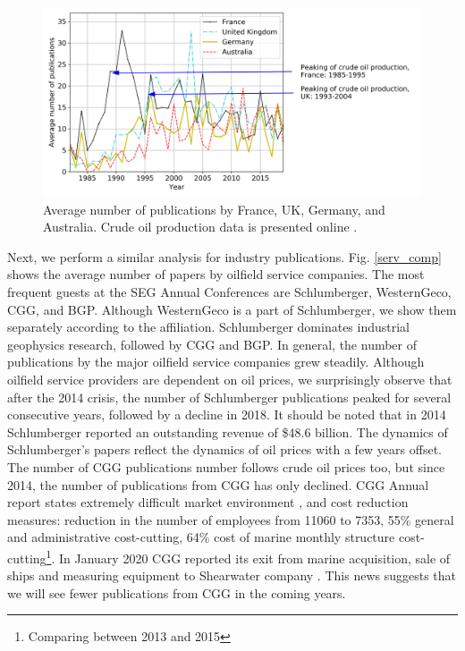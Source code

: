 \documentclass[geosciences,article,submit,moreauthors,pdftex]{Definitions/mdpi}
\begin{document}
\begin{figure}[ht!]
\includegraphics[width=\textwidth]{4_second_countries.png}
\caption{Average number of publications by France, UK, Germany, and Australia. Crude oil production data is presented online \citep{CEIC2020}.}
\label{acad_countries8}
\end{figure}


Next, we perform a similar analysis for industry publications. Fig. \ref{serv_comp} shows the average number of papers by oilfield service companies. The most frequent guests at the SEG Annual Conferences are Schlumberger, WesternGeco, CGG, and BGP. Although WesternGeco is a part of Schlumberger, we show them separately according to the affiliation. Schlumberger dominates industrial geophysics research, followed by CGG and BGP. In general, the number of publications by the major oilfield service companies grew steadily. Although oilfield service providers are dependent on oil prices, we surprisingly observe that after the 2014 crisis, the number of Schlumberger publications peaked for several consecutive years, followed by a decline in 2018. It should be noted that in 2014 Schlumberger reported an outstanding revenue of \$48.6 billion. The dynamics of Schlumberger's papers reflect the dynamics of oil prices with a few years offset. The number of CGG publications number follows crude oil prices too, but since 2014, the number of publications from CGG has only declined. CGG Annual report states extremely difficult market environment \citep{CGG2015}, and cost reduction measures: reduction in the number of employees from 11060 to 7353, 55\% general and administrative cost-cutting, 64\% cost of marine monthly structure cost-cutting\footnote{Comparing between 2013 and 2015}. In January 2020 CGG reported its exit from marine acquisition, sale of ships and measuring equipment to Shearwater company \citep{CGG2020}. This news suggests that we will see fewer publications from CGG in the coming years. 
\end{document}
